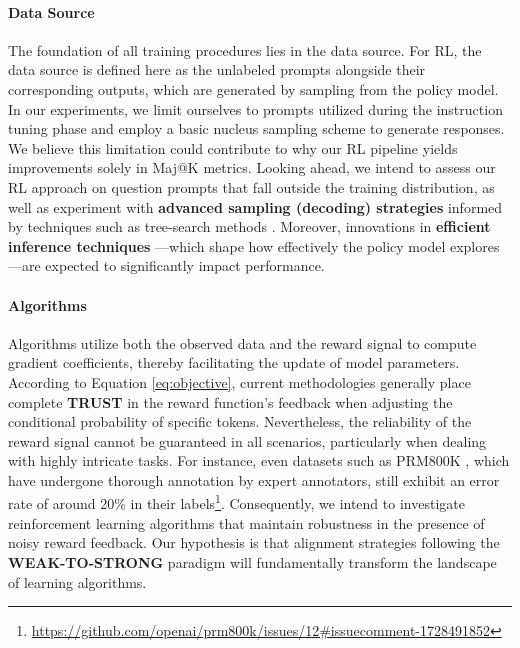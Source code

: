 \begin{itemize}[topsep=0pt]
\begin{itemize}[topsep=0pt]
\paragraph{Data Source} The foundation of all training procedures lies in the data source. For RL, the data source is defined here as the unlabeled prompts alongside their corresponding outputs, which are generated by sampling from the policy model. In our experiments, we limit ourselves to prompts utilized during the instruction tuning phase and employ a basic nucleus sampling scheme to generate responses. We believe this limitation could contribute to why our RL pipeline yields improvements solely in Maj@K metrics. Looking ahead, we intend to assess our RL approach on question prompts that fall outside the training distribution, as well as experiment with \textbf{advanced sampling (decoding) strategies} informed by techniques such as tree-search methods \citep{yao2023tree}. Moreover, innovations in \textbf{efficient inference techniques} \citep{xia-etal-2023-speculative,leviathan2023fast,kwon2023efficient,xia2024unlocking}—which shape how effectively the policy model explores—are expected to significantly impact performance.

\paragraph{Algorithms} Algorithms utilize both the observed data and the reward signal to compute gradient coefficients, thereby facilitating the update of model parameters. According to Equation \ref{eq:objective}, current methodologies generally place complete \textbf{TRUST} in the reward function's feedback when adjusting the conditional probability of specific tokens. Nevertheless, the reliability of the reward signal cannot be guaranteed in all scenarios, particularly when dealing with highly intricate tasks. For instance, even datasets such as PRM800K \citep{lightman2023let}, which have undergone thorough annotation by expert annotators, still exhibit an error rate of around 20\% in their labels\footnote{\url{https://github.com/openai/prm800k/issues/12\#issuecomment-1728491852}}. Consequently, we intend to investigate reinforcement learning algorithms that maintain robustness in the presence of noisy reward feedback. Our hypothesis is that alignment strategies following the \textbf{WEAK-TO-STRONG} \citep{burns2023weak} paradigm will fundamentally transform the landscape of learning algorithms.


\end{itemize}
\end{itemize}
